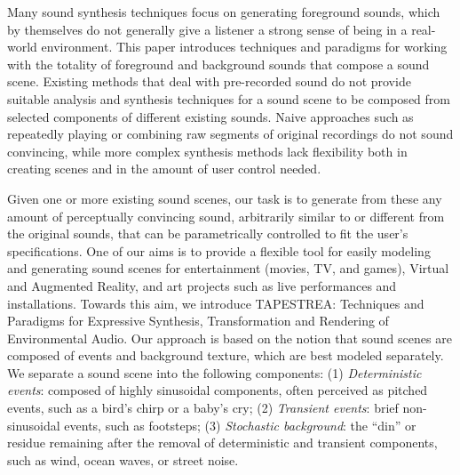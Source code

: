 \documentclass[twoside]{article}
\begin{document}
Many sound synthesis techniques focus on generating foreground sounds, 
which by themselves do not generally give a listener 
a strong sense of being in a real-world environment. This paper introduces 
techniques and paradigms for working with the totality of foreground and background 
sounds that compose a sound scene.
Existing methods that deal with pre-recorded sound do not 
provide suitable analysis and synthesis techniques for a sound scene to be composed 
from selected components of different existing sounds.
Naive approaches such as repeatedly playing or combining 
raw segments of original recordings do not sound convincing, while more complex 
synthesis methods lack flexibility both in creating scenes and in the 
amount of user control needed.

Given one or more existing sound scenes, our task is to generate from 
these any amount of perceptually convincing sound, arbitrarily similar to 
or different from the original sounds, that can be parametrically controlled to fit the user's 
specifications. One of our aims is to provide a flexible tool for 
easily modeling and generating sound scenes for 
entertainment (movies, TV, and games), Virtual and Augmented Reality, 
and art projects such as live performances and installations.
Towards this aim, we introduce TAPESTREA: Techniques and Paradigms for 
Expressive Synthesis, Transformation and Rendering of Environmental 
Audio. Our approach is based on the notion that sound scenes are 
composed of events and background texture, which are best modeled 
separately. We separate a sound scene into the following 
components:
(1) \emph{Deterministic events}: composed of highly sinusoidal components, 
often perceived as pitched events, such as a bird's chirp or a baby's cry;
(2) \emph{Transient events}: brief non-sinusoidal events, such as footsteps;
(3) \emph{Stochastic background}: the ``din'' or residue remaining after the 
removal of deterministic and transient components, such as wind, ocean waves, or 
street noise.
\end{document}
